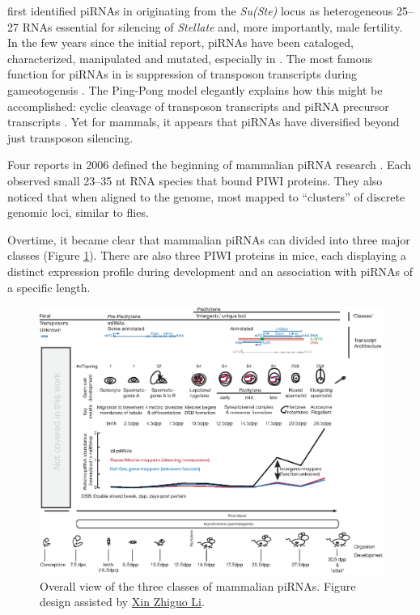 {    \citet{Aravin2001} first identified piRNAs in \flies{} originating from the \textit{Su(Ste)} locus as heterogeneous 25--27 RNAs essential for silencing of \textit{Stellate} and, more importantly, male fertility. In the few years since the initial report, piRNAs have been cataloged, characterized, manipulated and mutated, especially in \flies{} \citep{Siomi2011,Luteijn2013,Hirose2014}. The most famous function for piRNAs in \flies{} is suppression of transposon transcripts during gameotogensis \citep{Malone2009}. The Ping-Pong model elegantly explains how this might be accomplished: cyclic cleavage of transposon transcripts and piRNA precursor transcripts \citep{Brennecke2007,Gunawardane2007}. Yet for mammals, it appears that piRNAs have diversified beyond just transposon silencing.

    Four reports in 2006 defined the beginning of mammalian piRNA research \citep{Aravin2006,Grivna2006,Girard2006,Lau2006}. Each observed small 23--35 nt RNA species that bound PIWI proteins. They also noticed that when aligned to the genome, most mapped to  ``clusters'' of discrete genomic loci, similar to flies.

    Overtime, it became clear that mammalian piRNAs can divided into three major classes (Figure \ref{Intro:fig:Mammalian piRNA classes}). There are also three PIWI proteins in mice, each displaying a distinct expression profile during development and an association with piRNAs of a specific length.

    \begin{landscape}
      \begin{figure} %
        \centering 
        \includegraphics{Figures/Intro/MammalianPiRNAClassesOverTime.eps}
        \caption[Different Classes of mammalian piRNAs]
        {
          Overall view of the three classes of mammalian piRNAs. Figure design assisted by \href{mailto:xin.li@umassmed.edu}{Xin Zhiguo Li}.
          } \label{Intro:fig:Mammalian piRNA classes}
        \end{figure}
      \end{landscape}

}
